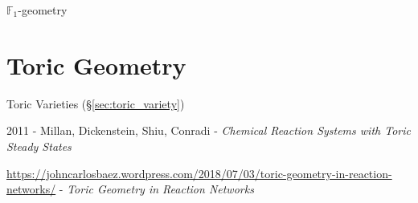 \fist $\mathbb{F}_1$-geometry



\section{Toric Geometry}\label{sec:toric_geometry}

Toric Varieties (\S\ref{sec:toric_variety})

2011 - Millan, Dickenstein, Shiu, Conradi - \emph{Chemical Reaction Systems with
  Toric Steady States}

\url{https://johncarlosbaez.wordpress.com/2018/07/03/toric-geometry-in-reaction-networks/}
- \emph{Toric Geometry in Reaction Networks}

